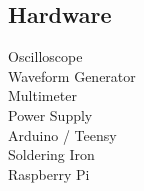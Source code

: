 \documentclass[]{deedy-resume-openfont}
\begin{document}
\begin{minipage}[t]{0.33\textwidth}
\subsection{Hardware}
Oscilloscope\\
Waveform Generator\\
Multimeter \\
Power Supply \\
Arduino / Teensy\\
Soldering Iron \\
Raspberry Pi \\
\sectionsep



%
%

\end{minipage} 
\hfill
\end{document}
